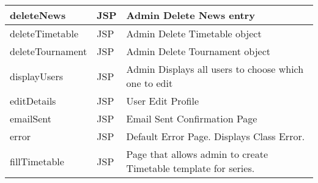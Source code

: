 \begin{table}[H]
\begin{center}
\begin{tabular}{| l | l | p{5cm} |}
	deleteNews & JSP & Admin Delete News entry\\ \hline	
	deleteTimetable & JSP & Admin Delete Timetable object\\ \hline	
	deleteTournament & JSP & Admin Delete Tournament object\\ \hline	
	displayUsers & JSP & Admin Displays all users to choose which one to edit\\ \hline	
	editDetails & JSP & User Edit Profile\\ \hline	
	emailSent & JSP & Email Sent Confirmation Page\\ \hline	
	error & JSP & Default Error Page. Displays Class Error. \\ \hline	
	fillTimetable & JSP & Page that allows admin to create Timetable template for series.\\ \hline	
    \end{tabular}
\end{center}
\end{table}
\pagebreak

